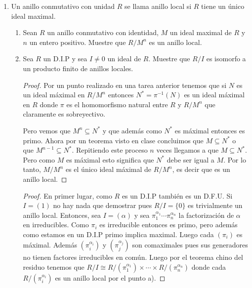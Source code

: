 \documentclass[letter,twoside,12pt]{article}
\begin{document}
\begin{enumerate}
\begin{enumerate}
\begin{proof}
Por el punto a) tenemos que $ \mathbb{Z}[x] $ es integralmente cerrado. Entonces considere el polinomio $ x^n-m $, que es un polinomio mónico con coeficientes en $ \mathbb{Z} $. $ \sqrt[n]{m} $ es precisamente una raiz de este polinomio en $ \mathbb{R}[x] $. Ahora si suponemos que $ \sqrt[n]{m} $ es racional entonces por el literal a) tendriamos que $ \sqrt[n]{m} $ sería un entero. Es decir que $ m = z^n $ para $ z = \sqrt[n]{m} \in \mathbb{Z} $, lo que contradice nuestra suposición que $ m $ no es potencia $ n $-ésima perfecta.
\end{proof}
\end{enumerate}
\item Un anillo conmutativo con unidad $ R $ se llama anillo local si $ R $ tiene un único ideal maximal.

\begin{enumerate}
\item  Sean $ R $ un anillo conmutativo con identidad, $ M $ un ideal maximal de $ R $ y $ n $ un entero positivo.
Muestre que $ R/M^n $ es un anillo local.

\item  Sea $ R $ un D.I.P y sea $ I \not = 0 $ un ideal de $ R $. Muestre que $ R/I $ es isomorfo a un producto finito de
anillos locales.
\begin{proof}
Por un punto realizado en una tarea anterior tenemos que si $ N $ es un ideal máximal en $ R/M^n $ entonces $N^*=\pi^{-1}(N)$ es un ideal máximal en $ R $ donde $ \pi $ es el homomorfismo natural entre $ R  $ y $ R/M^n $ que claramente es sobreyectivo.

Pero vemos que $M^n \subseteq N^* $ y que además como $ N^* $ es máximal entonces es primo. Ahora por un teorema visto en clase concluimos que $ M  \subseteq N^* $ o que $ M^{n-1} \subseteq N^*$. Repitiendo este proceso $ n $ veces llegamos a que $ M  \subseteq N^* $. Pero como $M$ es máximal esto significa que $ N^* $ debe ser igual a $ M $. Por lo tanto, $ M/M^n $ es el único ideal máximal de $ R/M^n $, es decir que es un anillo local.
\end{proof}
\begin{proof}
En primer lugar, como $ R $ es un D.I.P también es un D.F.U. Si $I=(1)$ no hay nada que demostrar pues $ R/I = \{0\}$ es trivialmente un anillo local. Entonces, sea $ I = (\alpha) $ y sea $ \pi_1^{\alpha_1} \cdots \pi_n^{\alpha_n} $ la factorización de $ \alpha $ en irreducibles. Como $ \pi_i $ es irreducible entonces es primo, pero además como estamos en un D.I.P primo implica maximal. Luego cada $ (\pi_i) $ es máximal. Además $ (\pi_i^{\alpha_i}) $ y $ (\pi_j^{\alpha_j}) $ son comaximales pues sus generadores no tienen factores irreducibles en común. Luego por el teorema chino del residuo tenemos que $ R/I \cong R/(\pi_1^{\alpha_1}) \times \cdots \times R/(\pi_n^{\alpha_n})$ donde cada $ R/(\pi_i^{\alpha_i}) $ es un anillo local por el punto a).
\end{proof}
\end{enumerate}
\end{enumerate}
\end{document}
